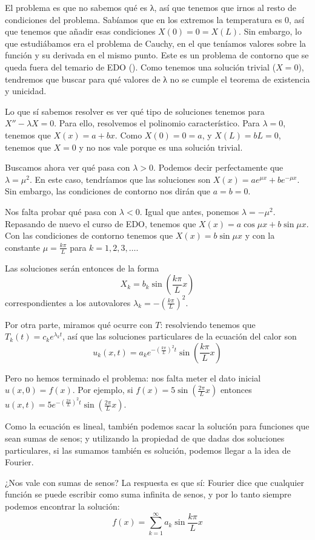 \documentclass[palatino]{apuntes}
\begin{document}
El problema es que no sabemos qué es λ, así que tenemos que irnos al resto de condiciones del problema. Sabíamos que en los extremos la temperatura es 0, así que tenemos que añadir esas condiciones $X(0) = 0 = X(L)$. Sin embargo, lo que estudiábamos era el problema de Cauchy, en el que teníamos valores sobre la función y su derivada en el mismo punto. Este es un problema de contorno que se queda fuera del temario de EDO (\cite{ApuntesEDO}). Como tenemos una solución trivial ($X = 0$), tendremos que buscar para qué valores de λ no se cumple el teorema de existencia y unicidad.

Lo que sí sabemos resolver es ver qué tipo de soluciones tenemos para $X'' - λX = 0$. Para ello, resolvemos el polinomio característico. Para $λ = 0$, tenemos que $X(x) = a+bx$. Como $X(0) = 0 = a$, y $X(L) = bL = 0$, tenemos que $X = 0$ y no nos vale porque es una solución trivial.

Buscamos ahora ver qué pasa con $λ > 0$. Podemos decir perfectamente que $λ = μ^2$. En este caso, tendríamos que las soluciones son $X(x) = ae^{μx} + be^{-μx}$. Sin embargo, las condiciones de contorno nos dirán que $a = b = 0$.

Nos falta probar qué pasa con $λ < 0$. Igual que antes, ponemos $λ = -μ^2$. Repasando de nuevo el curso de EDO, tenemos que $X(x) = a \cos μx + b \sin μx$. Con las condiciones de contorno tenemos que $X(x) = b \sin μx$ y con la constante $μ = \frac{kπ}{L}$ para $k = 1,2,3,\dotsc$.

Las soluciones serán entonces de la forma \[ X_k = b_k \sin (\frac{kπ}{L} x)\] correspondientes a los autovalores $λ_k = -\left(\frac{kπ}{L}\right)^2$. %

Por otra parte, miramos qué ocurre con $T$: resolviendo tenemos que $T_k(t) = c_k e^{λ_k t}$, así que las soluciones particulares de la ecuación del calor son \[ u_k(x,t) = a_k e^{-\left(\frac{kπ}{L}\right)^2t} \sin (\frac{kπ}{L} x) \]

Pero no hemos terminado el problema: nos falta meter el dato inicial $u(x,0) = f(x)$. Por ejemplo, si $f(x) = 5 \sin (\frac{2π}{L} x)$ entonces $u(x,t) = 5 e^{-\left(\frac{2π}{L}\right)^2t} \sin (\frac{2π}{L} x)$.

Como la ecuación es lineal, también podemos sacar la solución para funciones que sean sumas de senos; y utilizando la propiedad de que dadas dos soluciones particulares, si las sumamos también es solución, podemos llegar a la idea de Fourier.

¿Nos vale con sumas de senos? La respuesta es que sí: Fourier dice que cualquier función se puede escribir como suma infinita de senos, y por lo tanto siempre podemos encontrar la solución: \[ f(x) = \sum_{k=1}^∞ a_k \sin \frac{kπ}{L} x\]
\end{document}
